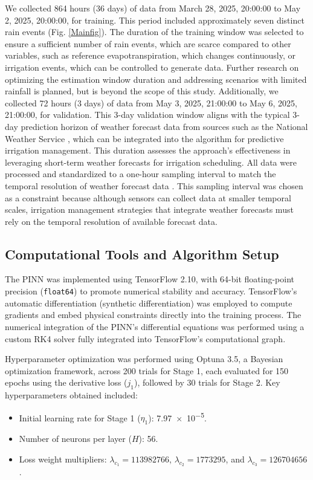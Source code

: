 \documentclass[pdflatex,sn-nature]{sn-jnl}%
\theoremstyle{thmstyleone}%
\theoremstyle{thmstyletwo}%
\theoremstyle{thmstylethree}%
\begin{document}
We collected 864 hours (36 days) of data from March 28, 2025, 20:00:00 to May 2, 2025, 20:00:00, for training. This period included approximately seven distinct rain events (Fig. \ref{Mainfig}). The duration of the training window was selected to ensure a sufficient number of rain events, which are scarce compared to other variables, such as reference evapotranspiration, which changes continuously, or irrigation events, which can be controlled to generate data. Further research on optimizing the estimation window duration and addressing scenarios with limited rainfall is planned, but is beyond the scope of this study.
Additionally, we collected 72 hours (3 days) of data from May 3, 2025, 21:00:00 to May 6, 2025, 21:00:00, for validation. This 3-day validation window aligns with the typical 3-day prediction horizon of weather forecast data from sources such as the National Weather Service \cite{NWS2024}, which can be integrated into the algorithm for predictive irrigation management. This duration assesses the approach's effectiveness in leveraging short-term weather forecasts for irrigation scheduling.
All data were processed and standardized to a one-hour sampling interval to match the temporal resolution of weather forecast data \cite{NWS2024}. This sampling interval was chosen as a constraint because although sensors can collect data at smaller temporal scales, irrigation management strategies that integrate weather forecasts must rely on the temporal resolution of available forecast data.
\subsection{Computational Tools and Algorithm Setup}
The PINN was implemented using TensorFlow 2.10, with 64-bit floating-point precision (\texttt{float64}) to promote numerical stability and accuracy. TensorFlow’s automatic differentiation (synthetic differentiation) was employed to compute gradients and embed physical constraints directly into the training process.
The numerical integration of the PINN’s differential equations was performed using a custom RK4 solver fully integrated into TensorFlow’s computational graph.

Hyperparameter optimization was performed using Optuna 3.5, a Bayesian optimization framework, across 200 trials for Stage 1, each evaluated for 150 epochs using the derivative loss ($j_1$), followed by 30 trials for Stage 2. Key hyperparameters obtained included:
\begin{itemize}
\item Initial learning rate for Stage 1 ($\eta_1$): \num{7.97e-5}.
\item Number of neurons per layer ($H$): 56.
\item Loss weight multipliers: $\lambda_{c_1} = \num{113982766}$, $\lambda_{c_2} = \num{1773295}$, and $\lambda_{c_3} = \num{126704656}$.
\end{itemize} 
\end{document}
